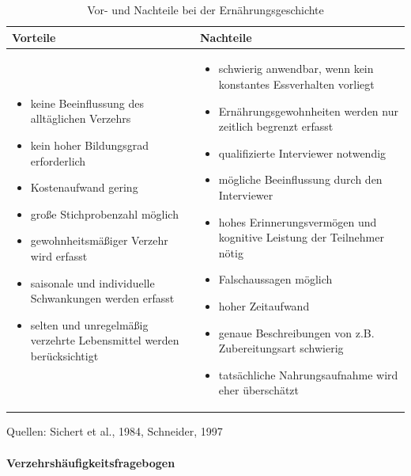 \begin{table}[!h]
\begin{flushleft}
\caption{Vor- und Nachteile bei der Ernährungsgeschichte}
\end{flushleft}
\begin{tabular}{p{7cm} p{7cm}}
Vorteile & Nachteile \\
\hline

\begin{itemize}
\item keine Beeinflussung des alltäglichen Verzehrs
\item kein hoher Bildungsgrad erforderlich
\item Kostenaufwand gering
\item große Stichprobenzahl möglich
\item gewohnheitsmäßiger Verzehr wird erfasst 
\item saisonale und individuelle Schwankungen werden erfasst
\item selten und unregelmäßig verzehrte Lebensmittel werden berücksichtigt

\end{itemize}

&

\begin{itemize}
\item schwierig anwendbar, wenn kein konstantes Essverhalten vorliegt
\item Ernährungsgewohnheiten werden nur zeitlich begrenzt erfasst
\item qualifizierte Interviewer notwendig
\item mögliche Beeinflussung durch den Interviewer
\item hohes Erinnerungsvermögen und kognitive Leistung der Teilnehmer nötig
\item Falschaussagen möglich
\item hoher Zeitaufwand
\item genaue Beschreibungen von z.B. Zubereitungsart schwierig
\item tatsächliche Nahrungsaufnahme wird eher überschätzt

\end{itemize}
\end{tabular}
\label{tab:Ernährungsgeschichte}
\end{table}
Quellen: Sichert et al., 1984, Schneider, 1997


\paragraph{Verzehrshäufigkeitsfragebogen}

